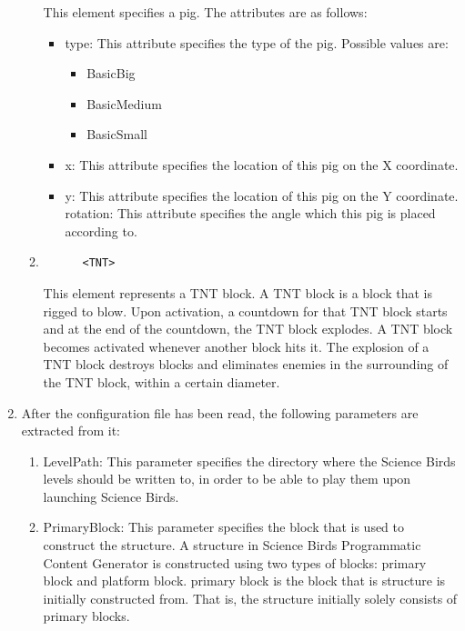 \documentclass{dalthesis}
\begin{document}
\begin{enumerate}
\begin{enumerate}
    This element specifies a pig. The attributes are as follows:

    \begin{itemize}
      \item type: This attribute specifies the type of the pig. Possible values are:

      \begin{itemize}
        \item BasicBig
        \item BasicMedium
        \item BasicSmall
      \end{itemize}

      \item x: This attribute specifies the location of this pig on the X coordinate.
      \item y: This attribute specifies the location of this pig on the Y coordinate.
      rotation: This attribute specifies the angle which this pig is placed according to.
    \end{itemize}

    \item

    \begin{lstlisting}
      <TNT>
    \end{lstlisting}

    This element represents a TNT block. A TNT block is a block that is rigged to blow. Upon activation, a countdown for that TNT block starts and at the end of the countdown, the TNT block explodes. A TNT block becomes activated whenever another block hits it. The explosion of a TNT block destroys blocks and eliminates enemies in the surrounding of the TNT block, within a certain diameter.
  \end{enumerate}

  \item After the configuration file has been read, the following parameters are extracted from it:

  \begin{enumerate}
    \item LevelPath: This parameter specifies the directory where the Science Birds levels should be written to, in order to be able to play them upon launching Science Birds.

    \item PrimaryBlock: This parameter specifies the block that is used to construct the structure. A structure in Science Birds Programmatic Content Generator is constructed using two types of blocks: primary block and platform block. primary block is the block that is structure is initially constructed from. That is, the structure initially solely consists of primary blocks.


\end{enumerate}
\end{enumerate}
\end{document}
